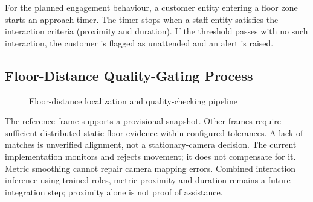 For the planned engagement behaviour, a customer entity entering a floor zone starts an approach timer. The timer stops when a staff entity satisfies the interaction criteria (proximity and duration). If the threshold passes with no such interaction, the customer is flagged as unattended and an alert is raised. 

\subsection{Floor-Distance Quality-Gating Process}
\begin{figure}[htbp]
\centering
{}
\caption{Floor-distance localization and quality-checking pipeline}
\label{fig:floor-pipeline}
\end{figure}

The reference frame supports a provisional snapshot. Other frames require sufficient distributed static floor evidence within configured tolerances. A lack of matches is unverified alignment, not a stationary-camera decision. The current implementation monitors and rejects movement; it does not compensate for it. Metric smoothing cannot repair camera mapping errors. Combined interaction inference using trained roles, metric proximity and duration remains a future integration step; proximity alone is not proof of assistance.
